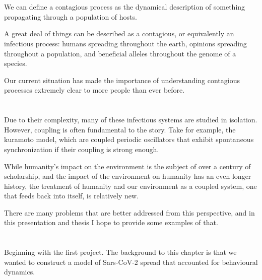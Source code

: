 \documentclass{article}
\begin{document}
\large

\section{}

We can define a contagious process as the dynamical description of something propagating through a population of hosts. 


A great deal of things can be described as a contagious, or equivalently an infectious process: humans spreading throughout the earth, opinions spreading throughout a population, and beneficial alleles throughout the genome of a species.

Our current situation has made the importance of understanding contagious processes extremely clear to more people than ever before.

\section{}
Due to their complexity, many of these infectious systems are studied in isolation. However, coupling is often fundamental to the story. Take for example, the kuramoto model, which are coupled periodic oscillators that exhibit spontaneous synchronization if their coupling is strong enough. 

While humanity's impact on the environment is the subject of over a century of scholarship, and the impact of the environment on humanity has an even longer history, the treatment of humanity and our environment as a coupled system, one that feeds back into itself, is relatively new. 

There are many problems that are better addressed from this perspective, and in this presentation and thesis I hope to provide some examples of that. 

\section{}
Beginning with the first project. The background to this chapter is that we wanted to construct a model of Sars-CoV-2 spread that accounted for behavioural dynamics. 
\end{document}

